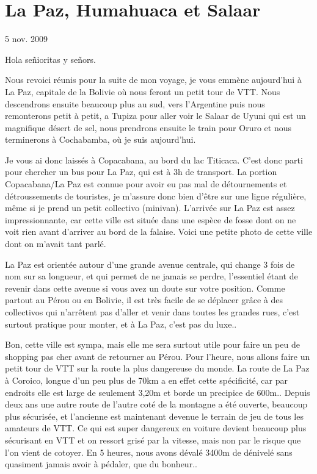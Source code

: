 \section{La Paz, Humahuaca et Salaar}

5 nov. 2009

\begin{multicols}{2}

Hola señioritas y señors.

Nous revoici réunis pour la suite de mon voyage, je vous emmène aujourd'hui à La Paz, capitale de la Bolivie où nous feront un petit tour de VTT. Nous descendrons ensuite beaucoup plus au sud, vers l'Argentine puis nous remonterons petit à petit, a Tupiza pour aller voir le Salaar de Uyuni qui est un magnifique désert de sel, nous prendrons ensuite le train pour Oruro et nous terminerons à Cochabamba, où je suis aujourd'hui.

Je vous ai donc laissés à Copacabana, au bord du lac Titicaca. C'est donc parti pour chercher un bus pour La Paz, qui est à 3h de transport. La portion Copacabana/La Paz est connue pour avoir eu pas mal de détournements et détroussements de touristes, je m'assure donc bien d'être sur une ligne régulière, même si je prend un petit collectivo (minivan). L'arrivée sur La Paz est assez impressionnante, car cette ville est située dans une espèce de fosse dont on ne voit rien avant d'arriver au bord de la falaise. Voici une petite photo de cette ville dont on m'avait tant parlé.


La Paz est orientée autour d'une grande avenue centrale, qui change 3 fois de nom sur sa longueur, et qui permet de ne jamais se perdre, l'essentiel étant de revenir dans cette avenue si vous avez un doute sur votre position. Comme partout au Pérou ou en Bolivie, il est très facile de se déplacer grâce à des collectivos qui n'arrêtent pas d'aller et venir dans toutes les grandes rues, c'est surtout pratique pour monter, et à La Paz, c'est pas du luxe..

Bon, cette ville est sympa, mais elle me sera surtout utile pour faire un peu de shopping pas cher avant de retourner au Pérou. Pour l'heure, nous allons faire un petit tour de VTT sur la route la plus dangereuse du monde. La route de La Paz à Coroico, longue d'un peu plus de 70km a en effet cette spécificité, car par endroits elle est large de seulement 3,20m et borde un precipice de 600m.. Depuis deux ans une autre route de l'autre coté de la montagne a été ouverte, beaucoup plus sécurisée, et l'ancienne est maintenant devenue le terrain de jeu de tous les amateurs de VTT. Ce qui est super dangereux en voiture devient beaucoup plus sécurisant en VTT et on ressort grisé par la vitesse, mais non par le risque que l'on vient de cotoyer. En 5 heures, nous avons dévalé 3400m de dénivelé sans quasiment jamais avoir à pédaler, que du bonheur..


\end{multicols}
